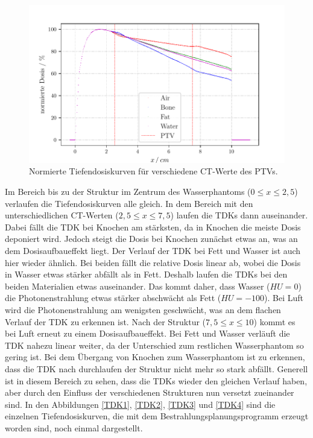 \begin{figure}[H]
  \centering
  \includegraphics[width=\textwidth]{build/Aufgabe3.2.pdf}
  \caption{Normierte Tiefendosiskurven für verschiedene CT-Werte des PTVs.}
  \label{abb:3.2}
\end{figure}

Im Bereich bis zu der Struktur im Zentrum des Wasserphantoms ($0 \leq x \leq 2,5$) verlaufen
die Tiefendosiskurven alle gleich.
In dem Bereich mit den unterschiedlichen CT-Werten ($2,5 \leq x \leq 7,5$)
laufen die TDKs dann auseinander. Dabei fällt die TDK bei Knochen am stärksten, da in Knochen
die meiste Dosis deponiert wird. Jedoch steigt die Dosis bei Knochen zunächst etwas an, was an dem Dosisaufbaueffekt liegt.
Der Verlauf der TDK bei Fett und Wasser ist auch hier wieder ähnlich. Bei beiden fällt die relative Dosis linear
ab, wobei die Dosis in Wasser etwas stärker abfällt als in Fett. Deshalb laufen die TDKs bei den beiden Materialien etwas auseinander.
Das kommt daher, dass Wasser ($HU = 0$) die Photonenstrahlung etwas stärker abschwächt als Fett ($HU = -100$).
Bei Luft wird die Photonenstrahlung am wenigsten geschwächt, was an dem flachen Verlauf
der TDK zu erkennen ist. Nach der Struktur ($7,5 \leq x \leq 10$) kommt es bei Luft erneut zu
einem Dosisaufbaueffekt. Bei Fett und Wasser verläuft die TDK nahezu linear weiter,
da der Unterschied zum restlichen Wasserphantom so gering ist. Bei dem Übergang von Knochen zum
Wasserphantom ist zu erkennen, dass die TDK nach durchlaufen der Struktur nicht mehr so stark abfällt.
Generell ist in diesem Bereich zu sehen, dass die TDKs wieder den gleichen Verlauf haben, aber durch den Einfluss
der verschiedenen Strukturen nun versetzt zueinander sind.
In den Abbildungen \ref{TDK1}, \ref{TDK2}, \ref{TDK3} und \ref{TDK4} sind die einzelnen Tiefendosiskurven,
die mit dem Bestrahlungsplanungsprogramm erzeugt worden sind, noch einmal dargestellt.


